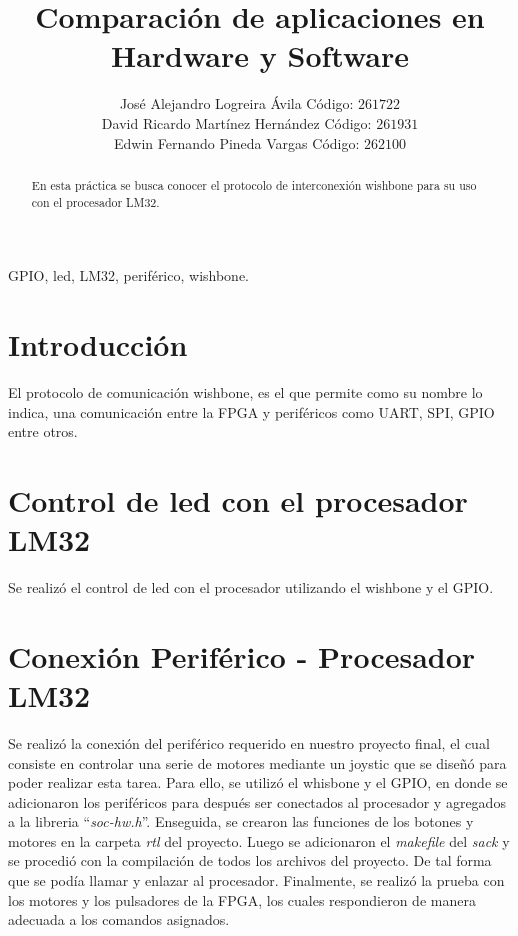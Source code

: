\documentclass[twocolumn]{IEEEtran}
\begin{document}
\title{Comparación de aplicaciones en Hardware y Software}
\author{José Alejandro Logreira Ávila Código: $261722$\\
	David Ricardo Martínez Hernández Código: $261931$\\
	Edwin Fernando Pineda Vargas Código: $262100$}
\maketitle
{}
\begin{keywords}
GPIO, led, LM32, periférico, wishbone.
\end{keywords}
\begin{abstract}
 En esta práctica se busca conocer el protocolo de interconexión wishbone para su uso con el procesador LM32.
\end{abstract}

\section{Introducción}
\noindent
El protocolo de comunicación wishbone, es el que permite como su nombre lo indica, una comunicación entre la FPGA y periféricos como UART, SPI, GPIO entre otros.

\section{Control de led con el procesador LM32}
\noindent
Se realizó el control de led con el procesador utilizando el wishbone y el GPIO.

\section{Conexión Periférico - Procesador LM32}
\noindent
Se realizó la conexión del periférico requerido en nuestro proyecto final, el cual consiste en controlar una serie de motores mediante un joystic que se diseñó para poder realizar esta tarea. Para ello, se utilizó el whisbone y el GPIO, en donde se adicionaron los periféricos para después ser conectados al procesador y agregados a la libreria ``\textit{soc-hw.h}''. Enseguida, se crearon las funciones de los botones y motores en la carpeta \textit{rtl} del proyecto. Luego se adicionaron el \textit{makefile} del \textit{sack} y se procedió con la compilación de todos los archivos del proyecto. De tal forma que se podía llamar y enlazar al procesador. Finalmente, se realizó la prueba con los motores y los pulsadores de la FPGA, los cuales respondieron de manera adecuada a los comandos asignados.
\end{document}
